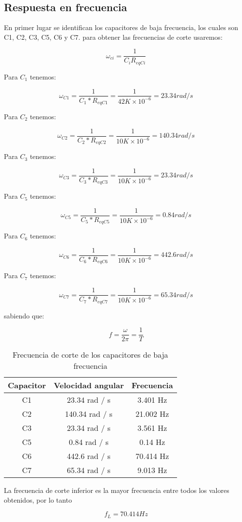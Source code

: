 \subsection{Respuesta en frecuencia}

En primer lugar se identifican los capacitores de baja frecuencia, los cuales son C1, C2, C3, C5, C6 y C7. para obtener las frecuencias de corte usaremos:

$$ \omega_{ci} = \frac{1}{C_i R_{eqCi}}$$

Para $C_1$ tenemos:

$$ \omega_{C1} = \frac{1}{C_1 * R_{eqC1}} =  \frac{1}{42K \times 10^{-6}} = 23.34 rad / s$$ 

Para $C_2$ tenemos:

$$ \omega_{C2} = \frac{1}{C_2 * R_{eqC2}} =  \frac{1}{10K \times 10^{-6}} = 140.34 rad / s$$ 

Para $C_3$ tenemos:

$$ \omega_{C3} = \frac{1}{C_3 * R_{eqC3}} =  \frac{1}{10K \times 10^{-6}} = 23.34 rad / s$$ 

Para $C_5$ tenemos:

$$ \omega_{C5} = \frac{1}{C_5 * R_{eqC5}} =  \frac{1}{10K \times 10^{-6}} = 0.84 rad / s$$ 

Para $C_6$ tenemos:

$$ \omega_{C6} = \frac{1}{C_6 * R_{eqC6}} =  \frac{1}{10K \times 10^{-6}} = 442.6 rad / s$$ 

Para $C_7$ tenemos:

$$ \omega_{C7} = \frac{1}{C_7 * R_{eqC7}} =  \frac{1}{10K \times 10^{-6}} = 65.34 rad / s$$

sabiendo que: 

$$ f = \frac{\omega}{2\pi} = \frac{1}{T} $$

\begin{table}[ht]
    \centering
    \begin{tabular}{|c|c|c|}
    \hline
    Capacitor & Velocidad angular & Frecuencia\\
    \hline
    C1 & 23.34 rad / s & 3.401 Hz\\
    \hline
    C2 & 140.34 rad / s & 21.002 Hz\\
    \hline
    C3 & 23.34 rad / s & 3.561 Hz\\
    \hline
    C5 & 0.84 rad / s & 0.14 Hz\\
    \hline
    C6 & 442.6 rad / s & 70.414 Hz\\
    \hline
    C7 & 65.34 rad / s & 9.013 Hz\\
    \hline
    \end{tabular}
    \caption{Frecuencia de corte de los capacitores de baja frecuencia}
    \label{tab:frecuencia-de-corte-capacitores-baja-frecuencia}
\end{table}


La frecuencia de corte inferior es la mayor frecuencia entre todos los valores obtenidos, por lo tanto

$$ f_{L} = 70.414 Hz$$
